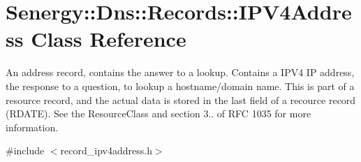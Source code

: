 \hypertarget{class_senergy_1_1_dns_1_1_records_1_1_i_p_v4_address}{\section{Senergy\-:\-:Dns\-:\-:Records\-:\-:I\-P\-V4\-Address Class Reference}
\label{class_senergy_1_1_dns_1_1_records_1_1_i_p_v4_address}
}


An address record, contains the answer to a lookup. Contains a I\-P\-V4 I\-P address, the response to a question, to lookup a hostname/domain name. This is part of a resource record, and the actual data is stored in the last field of a recource record (R\-D\-A\-T\-E). See the Resource\-Class and section 3.. of R\-F\-C 1035 for more information.  




{\ttfamily \#include $<$record\-\_\-ipv4address.\-h$>$}

